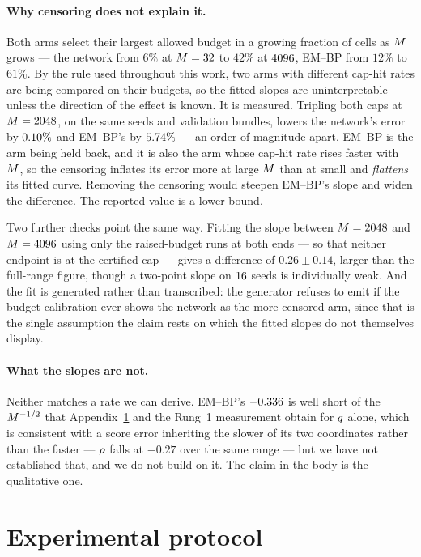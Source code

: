 \paragraph{Why censoring does not explain it.} Both arms select their largest
allowed budget in a growing fraction of cells as $M$ grows --- the network
from $6\%$ at $M=32$ to $42\%$ at $4096$, EM--BP from $12\%$ to $61\%$.
By the rule used throughout this work, two arms with different cap-hit rates are
being compared on their budgets, so the fitted slopes are uninterpretable unless
the direction of the effect is known. It is measured. Tripling both caps at
$M=2048$, on the same seeds and validation bundles, lowers the network's
error by $0.10\%$ and EM--BP's by $5.74\%$ --- an order of
magnitude apart. EM--BP is the arm being held back, and it is also the arm whose
cap-hit rate rises faster with $M$, so the censoring inflates its error more
at large $M$ than at small and \emph{flattens} its fitted curve. Removing the
censoring would steepen EM--BP's slope and widen the difference. The reported
value is a lower bound.

Two further checks point the same way. Fitting the slope between $M=2048$
and $M=4096$ using only the raised-budget runs at both ends --- so that
neither endpoint is at the certified cap --- gives a difference of $0.26 \pm 0.14$,
larger than the full-range figure, though a two-point slope on $16$ seeds
is individually weak. And the fit is generated rather than transcribed: the
generator refuses to emit if the budget calibration ever shows the network as the
more censored arm, since that is the single assumption the claim rests on which
the fitted slopes do not themselves display.

\paragraph{What the slopes are not.} Neither matches a rate we can derive.
EM--BP's $-0.336$ is well short of the $M^{-1/2}$ that
Appendix~\ref{app:protocol} and the Rung~1 measurement obtain for $q$ alone,
which is consistent with a score error inheriting the slower of its two
coordinates rather than the faster --- $\rho$ falls at $-0.27$ over the same
range --- but we have not established that, and we do not build on it. The claim
in the body is the qualitative one.

\section{Experimental protocol}
\label{app:protocol}

